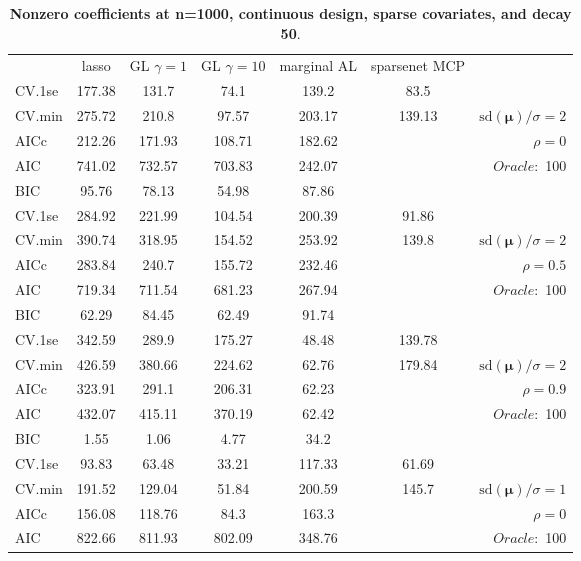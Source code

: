 \begin{table}\vspace{-.5cm}
\caption[l]{ { \bf Nonzero coefficients at n=1000, continuous design, 
sparse covariates, and  decay  50}.}
\vspace{-.5cm}
\footnotesize{}
\begin{center}
\begin{tabular}{l*{5}{c}|r}
& lasso & GL $\gamma=1$ & GL $\gamma=10$ & marginal AL & sparsenet MCP  & \\
 \cline{1-7}
CV.1se & 177.38 & 131.7 & 74.1 & 139.2 & 83.5 & \\
CV.min & 275.72 & 210.8 & 97.57 & 203.17 & 139.13 &  $\mathrm{sd}(\mathbf{\mu})/\sigma=2$ \\
AICc & 212.26 & 171.93 & 108.71 & 182.62 & & $\rho=0$ \\
AIC & 741.02 & 732.57 & 703.83 & 242.07 & &  \multirow{2}{*}{$Oracle: $ 100} \\
BIC & 95.76 & 78.13 & 54.98 & 87.86 & &  \\
 \hline 
CV.1se & 284.92 & 221.99 & 104.54 & 200.39 & 91.86 & \\
CV.min & 390.74 & 318.95 & 154.52 & 253.92 & 139.8 &  $\mathrm{sd}(\mathbf{\mu})/\sigma=2$ \\
AICc & 283.84 & 240.7 & 155.72 & 232.46 & & $\rho=0.5$ \\
AIC & 719.34 & 711.54 & 681.23 & 267.94 & &  \multirow{2}{*}{$Oracle: $ 100} \\
BIC & 62.29 & 84.45 & 62.49 & 91.74 & &  \\
 \hline 
CV.1se & 342.59 & 289.9 & 175.27 & 48.48 & 139.78 & \\
CV.min & 426.59 & 380.66 & 224.62 & 62.76 & 179.84 &  $\mathrm{sd}(\mathbf{\mu})/\sigma=2$ \\
AICc & 323.91 & 291.1 & 206.31 & 62.23 & & $\rho=0.9$ \\
AIC & 432.07 & 415.11 & 370.19 & 62.42 & &  \multirow{2}{*}{$Oracle: $ 100} \\
BIC & 1.55 & 1.06 & 4.77 & 34.2 & &  \\
 \hline 
CV.1se & 93.83 & 63.48 & 33.21 & 117.33 & 61.69 & \\
CV.min & 191.52 & 129.04 & 51.84 & 200.59 & 145.7 &  $\mathrm{sd}(\mathbf{\mu})/\sigma=1$ \\
AICc & 156.08 & 118.76 & 84.3 & 163.3 & & $\rho=0$ \\
AIC & 822.66 & 811.93 & 802.09 & 348.76 & &  \multirow{2}{*}{$Oracle: $ 100} \\

\end{tabular}
\end{center}
\end{table}

